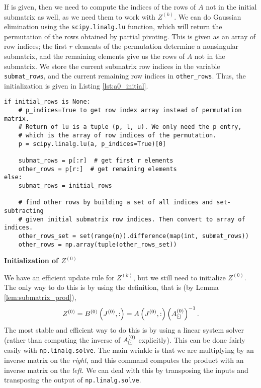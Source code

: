 \documentclass{article}
\begin{document}
	If \vinitialrows{} is given, then we need to compute the indices of the rows of $A$ not in the initial submatrix as well, as we need them to work with $Z^{(k)}$. We can do Gaussian elimination using the \texttt{scipy.linalg.lu} function, which will return the permutation of the rows obtained by partial pivoting. This is given as an array of row indices; the first $r$ elements of the permutation determine a nonsingular submatrix, and the remaining elements give us the rows of $A$ not in the submatrix. We store the current submatrix row indices in the variable \texttt{submat\_rows}, and the current remaining row indices in \texttt{other\_rows}. Thus, the initialization is given in Listing \ref{lst:a0_initial}.
	\begin{lstlisting}[caption={$\matstep{0}$ initialization}, label=lst:a0_initial]
if initial_rows is None:
    # p_indices=True to get row index array instead of permutation matrix.
    # Return of lu is a tuple (p, l, u). We only need the p entry, 
    # which is the array of row indices of the permutation.
    p = scipy.linalg.lu(a, p_indices=True)[0]
    
    submat_rows = p[:r]  # get first r elements
    other_rows = p[r:]  # get remaining elements
else:
    submat_rows = initial_rows
    
    # find other rows by building a set of all indices and set-subtracting
    # given initial submatrix row indices. Then convert to array of indices.
    other_rows_set = set(range(n)).difference(map(int, submat_rows))
    other_rows = np.array(tuple(other_rows_set))
	\end{lstlisting}
	
	\textbf{Initialization of $Z^{(0)}$}
	
	We have an efficient update rule for $Z^{(k)}$, but we still need to initialize $Z^{(0)}$. The only way to do this is by using the definition, that is (by Lemma \ref{lem:submatrix_prod}),
	\begin{equation}
		Z^{(0)} = B^{(0)}\left(J^{(0)}, :\right) = A\left(J^{(0)}, :\right)\left(A_\boxdot^{(0)}\right)^{-1}.
	\end{equation}
	\newcommand{\vz}{\texttt{z}}
	The most stable and efficient way to do this is by using a linear system solver (rather than computing the inverse of $A_\boxdot^{(0)}$ explicitly). This can be done fairly easily with \texttt{np.linalg.solve}. The main wrinkle is that we are multiplying by an inverse matrix on the \textit{right}, and this command computes the product with an inverse matrix on the \textit{left}. We can deal with this by transposing the inputs and transposing the output of \texttt{np.linalg.solve}. 
	
\end{document}
